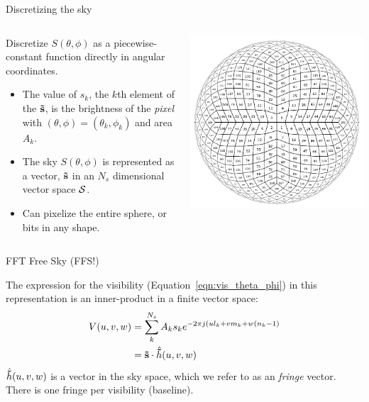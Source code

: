 \documentclass[ignorenonframetext]{beamer}
\begin{document}
\begin{frame}{Discretizing the sky}
\begin{columns}
 \begin{column}{0.45\linewidth}
   Discretize $S(\theta, \phi)$ as a piecewise-constant function directly in angular coordinates. 
\begin{itemize}
\item The value of $s_k$, the $k$th element of the $\mathbf{\vec{s}}$, is the brightness of the {\em pixel} with $(\theta, \phi) = (\theta_k, \phi_k)$ and area $A_k$. 
 \item The sky $S(\theta, \phi)$ is 
represented as a vector, $\mathbf{\vec{s}}$ in an $N_s$ dimensional vector space $\mathcal{S}$.
\item Can pixelize the entire sphere, or bits in any shape.
\end{itemize}
 \end{column}
 \begin{column}{0.55\linewidth}
 \includegraphics[width=\linewidth]{fig/hemisphere_pixels_3.pdf}  
 \end{column}
\end{columns}
\end{frame}

\begin{frame}{FFT Free Sky (FFS!)}

The expression for the visibility (Equation~\ref{eqn:vis_theta_phi}) in this representation is an inner-product in a finite vector space:
\begin{align}
 V(u, v, w) &= \sum_k^{N_s} A_k s_k e^{-2 \pi j (u l_k + v m_k + w(n_k-1)} \\ 
  &= \mathbf{\vec{s}} \cdot \hat{\mathbf{\vec{h}}}(u, v, w)
 \label{eqn:sky_fringe_vis}
\end{align}
$\hat{\mathbf{\vec{h}}}(u, v, w)$ is a vector in the sky space, which we refer to as an {\em fringe} vector. There is one fringe per visibility (baseline).
\end{frame}
\end{document}
